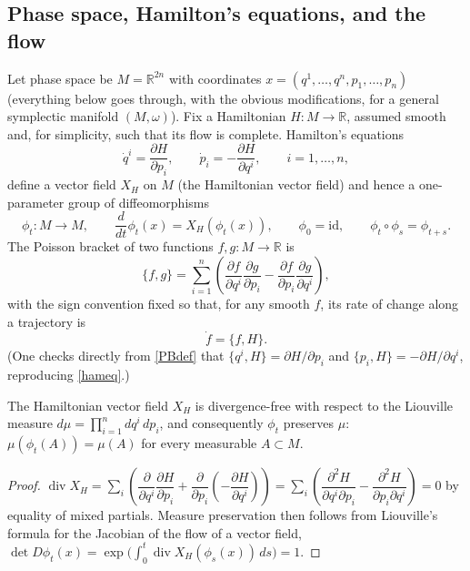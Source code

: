 \subsection{Phase space, Hamilton's equations, and the flow}

Let phase space be $M=\mathbb R^{2n}$ with coordinates
$x=(q^1,\dots,q^n,p_1,\dots,p_n)$ (everything below goes through, with the
obvious modifications, for a general symplectic manifold $(M,\omega)$). Fix a
Hamiltonian $H:M\to\mathbb R$, assumed smooth and, for simplicity, such that its flow
is complete. Hamilton's equations
\begin{equation}
\dot q^i = \frac{\partial H}{\partial p_i}, 
    \qquad \dot p_i = -\frac{\partial H}{\partial q^i}, \qquad i=1,\dots,n,
\label{hameq}
\end{equation}
define a vector field $X_H$ on $M$ (the Hamiltonian vector field) and hence
a one-parameter group of diffeomorphisms
\begin{equation}
\phi_t : M \to M, \qquad \frac{d}{d t}\phi_t(x) = X_H(\phi_t(x)), 
    \qquad \phi_0=\mathrm{id}, \qquad \phi_t\circ\phi_s=\phi_{t+s}.
\label{flow}
\end{equation}
The Poisson bracket of two functions $f,g:M\to\mathbb R$ is
\begin{equation}
\{f,g\} = \sum_{i=1}^n\left(\frac{\partial f}{\partial q^i}
    \frac{\partial g}{\partial p_i}-\frac{\partial f}{\partial p_i}
    \frac{\partial g}{\partial q^i}\right),
\label{PBdef}
\end{equation}
with the sign convention fixed so that, for any smooth $f$, 
its rate of change along a trajectory is
\begin{equation}
\dot f = \{f,H\}.
\label{eom}
\end{equation}
(One checks directly from \eqref{PBdef} that 
$\{q^i,H\}=\partial H/\partial p_i$ and 
$\{p_i,H\}=-\partial H/\partial q^i$, reproducing \eqref{hameq}.)

\begin{proposition}
\label{liouville}
The Hamiltonian vector field $X_H$ is divergence-free with respect to the 
    Liouville measure $d\mu = \prod_{i=1}^n d q^i\,d p_i$, and 
    consequently $\phi_t$ preserves $\mu$: $\mu(\phi_t(A))=\mu(A)$ 
    for every measurable $A\subset M$.
\end{proposition}
\begin{proof}
$\operatorname{div}X_H = \sum_i\left(\dfrac{\partial}{\partial q^i}
    \dfrac{\partial H}{\partial p_i}+\dfrac{\partial}{\partial p_i}
    \left(-\dfrac{\partial H}{\partial q^i}\right)\right)=
    \sum_i\left(\dfrac{\partial^2 H}{\partial q^i\partial p_i}-
    \dfrac{\partial^2 H}{\partial p_i\partial q^i}\right)=0$ 
    by equality of mixed partials. Measure preservation then follows from 
    Liouville's formula for the Jacobian of the flow of a vector field, 
    $\det D\phi_t(x) = \exp\!\big(\int_0^t 
    \operatorname{div}X_H(\phi_s(x))\,d s\big)=1$.
\end{proof}

